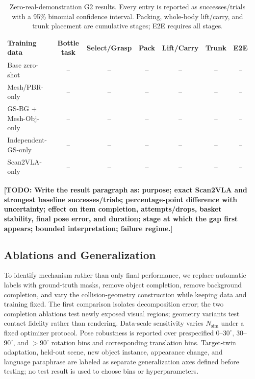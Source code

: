 \documentclass[letterpaper,10pt,conference]{ieeeconf}
\newcommand{\todo}[1]{\textbf{[TODO: #1]}}
\begin{document}
\begin{table}[t]
  \caption{Zero-real-demonstration G2 results. Every entry is reported as
  successes/trials with a 95\% binomial confidence interval. Packing, whole-body
  lift/carry, and trunk placement are cumulative stages; E2E requires all stages.}
  \label{tab:task-scale}
  \centering
  \small
  \begin{tabular}{lcccccc}
    \toprule
    Training data & Bottle task & Select/Grasp & Pack & Lift/Carry & Trunk & E2E \\
    \midrule
    Base zero-shot & -- & -- & -- & -- & -- & -- \\
    Mesh/PBR-only & -- & -- & -- & -- & -- & -- \\
    GS-BG + Mesh-Obj-only & -- & -- & -- & -- & -- & -- \\
    Independent-GS-only & -- & -- & -- & -- & -- & -- \\
    Scan2VLA-only & -- & -- & -- & -- & -- & -- \\
    \bottomrule
  \end{tabular}
\end{table}

\todo{Write the result paragraph as: purpose; exact Scan2VLA and strongest
baseline successes/trials; percentage-point difference with uncertainty; effect
on item completion, attempts/drops, basket stability, final pose error, and
duration; stage at which the gap first appears; bounded interpretation; failure
regime.}

\subsection{Ablations and Generalization}
To identify mechanism rather than only final performance, we replace automatic
labels with ground-truth masks, remove object completion, remove background
completion, and vary the collision-geometry construction while keeping data and
training fixed. The first comparison isolates decomposition error; the two
completion ablations test newly exposed visual regions; geometry variants test
contact fidelity rather than rendering. Data-scale sensitivity varies
$N_{\mathrm{sim}}$ under a fixed optimizer protocol. Pose robustness is reported
over prespecified $0$--$30^\circ$, $30$--$90^\circ$, and $>90^\circ$ rotation
bins and corresponding translation bins. Target-twin adaptation, held-out scene,
new object instance, appearance change, and language paraphrase are labeled as
separate generalization axes defined before testing; no test result is used to
choose bins or hyperparameters.
\end{document}
